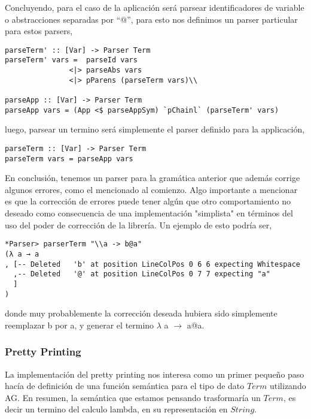 \documentclass[a4paper,10pt]{article}
\begin{document}
Concluyendo, para el caso de la aplicación será parsear identificadores de variable
o abstracciones separadas por ``$@$'', para esto nos definimos un parser particular
para estos parsers,

\begin{lstlisting}
parseTerm' :: [Var] -> Parser Term
parseTerm' vars =  parseId vars
               <|> parseAbs vars
               <|> pParens (parseTerm vars)\\

parseApp :: [Var] -> Parser Term
parseApp vars = (App <$ parseAppSym) `pChainl` (parseTerm' vars)
\end{lstlisting}

luego, parsear un termino será simplemente el parser definido para la applicación,\\

\begin{lstlisting}
parseTerm :: [Var] -> Parser Term
parseTerm vars = parseApp vars
\end{lstlisting}

En conclusión, tenemos un parser para la gramática anterior que además corrige 
algunos errores, como el mencionado al comienzo. Algo importante a mencionar es
que la corrección de errores puede tener algún que otro comportamiento no deseado
como consecuencia de una implementación "simplista" en términos del uso del 
poder de corrección de la librería. Un ejemplo de esto podría ser,

\begin{verbatim}
*Parser> parserTerm "\\a -> b@a"
(λ a → a
, [-- Deleted   'b' at position LineColPos 0 6 6 expecting Whitespace
  ,-- Deleted   '@' at position LineColPos 0 7 7 expecting "a"
  ]
)
\end{verbatim}

donde muy probablemente la corrección deseada hubiera sido simplemente reemplazar
b por a, y generar el termino $\lambda$ a $\rightarrow$ a@a.

\subsubsection{Pretty Printing}

La implementación del pretty printing nos interesa como un primer pequeño paso
hacía de definición de una función semántica para el tipo de dato $Term$ utilizando
AG. En resumen, la semántica que estamos pensando trasformaría un $Term$, es decir
un termino del calculo lambda, en su representación en $String$.\\
\end{document}
